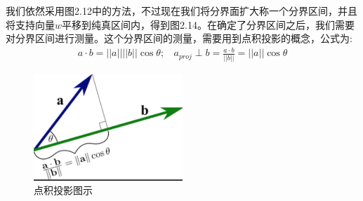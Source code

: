 \documentclass[12pt]{article}
\numberwithin{figure}{section}
\numberwithin{equation}{section}
\begin{document}
我们依然采用图2.12中的方法，不过现在我们将分界面扩大称一个分界区间，并且将支持向量$w$平移到纯真区间内，得到图2.14。在确定了分界区间之后，我们需要对分界区间进行测量。这个分界区间的测量，需要用到点积投影的概念，公式为:
\begin{align*}
	a \cdot b= ||a|| ||b|| \cos \theta; \ \ \ \ a_{proj} \perp b = \frac{a \cdot b}{||b||} = ||a || \cos \theta
\end{align*}
\begin{figure}[H]
	\centering
	\includegraphics[width=0.5\textwidth]{fig/C2C2svmprojc}
	\caption{点积投影图示}
\end{figure}
\end{document}
